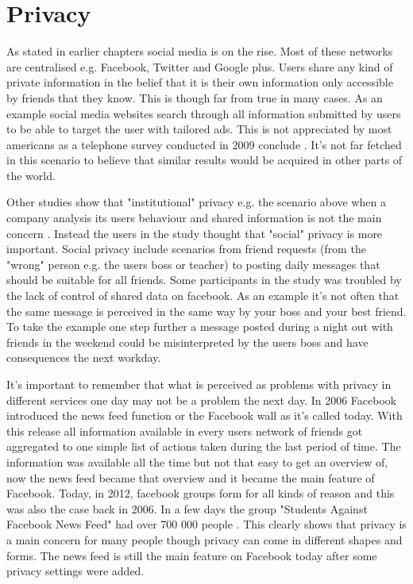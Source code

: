 \section{Privacy}
As stated in earlier chapters social media is on the rise.
Most of these networks are centralised e.g. Facebook, Twitter and Google plus.
Users share any kind of private information in the belief that it is their own information only accessible by friends that they know.
This is though far from true in many cases.
As an example social media websites search through all information submitted by users to be able to target the user with tailored ads.
This is not appreciated by most americans as a telephone survey conducted in 2009 conclude \cite{turow2009}.
It's not far fetched in this scenario to believe that similar results would be acquired in other parts of the world.

Other studies show that "institutional" privacy e.g. the scenario above when a company analysis its users behaviour and shared information is not the main concern \cite{raynes-goldie2010}.
Instead the users in the study thought that "social" privacy is more important.
Social privacy include scenarios from friend requests (from the "wrong" person e.g. the users boss or teacher) to posting daily messages that should be suitable for all friends.
Some participants in the study was troubled by the lack of control of shared data on facebook.
As an example it's not often that the same message is perceived in the same way by your boss and your best friend.
To take the example one step further a message posted during a night out with friends in the weekend could be misinterpreted by the users boss and have consequences the next workday.

It's important to remember that what is perceived as problems with privacy in different services one day may not be a problem the next day.
In 2006 Facebook introduced the news feed function or the Facebook wall as it's called today.
With this release all information available in every users network of friends got aggregated to one simple list of actions taken during the last period of time.
The information was available all the time but not that easy to get an overview of, now the news feed became that overview and it became the main feature of Facebook.
Today, in 2012, facebook groups form for all kinds of reason and this was also the case back in 2006.
In a few days the group "Students Against Facebook News Feed" had over 700 000 people \cite{boyd2008}.
This clearly shows that privacy is a main concern for many people though privacy can come in different shapes and forms.
The news feed is still the main feature on Facebook today after some privacy settings were added.


